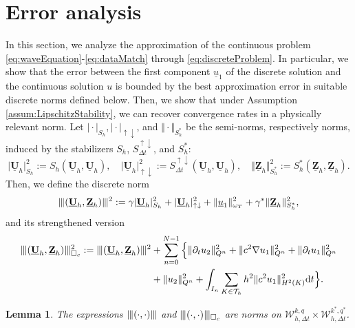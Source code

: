 \documentclass[sn-mathphys-num]{sn-jnl}
\newtheorem{lem}[thm]{Lemma}
\numberwithin{equation}{section}
\newcommand{\wop}{\square_c}
\newcommand{\tnorm}[1]{\vert\hspace{-0.3mm}\Vert#1\Vert\hspace{-0.3mm}\vert}
\newcommand{\dT}{\mathrm{d}t}
\newcommand{\ProdFullyDiscrSpace}[2]{ \mathcal{W}^{ {#1},{#2}}_{h, \Delta t  } }
\newcommand{\Uh}{\underline{\mathbf{U}}_h}
\newcommand{\Zh}{\underline{\mathbf{Z}}_h}
\newcommand{\ul}{\underline{u}}
\newcommand{\Sud}{S^{\uparrow \downarrow}_{\Delta t}}
\newcommand{\dt}{\partial_t}
\begin{document}
\section{Error analysis}
\noindent In this section, we analyze the approximation of the continuous problem \eqref{eq:waveEquation}-\eqref{eq:dataMatch} through \eqref{eq:discreteProblem}. In particular, we show that the error between the first component $\ul_1$ of the discrete solution and the continuous solution $u$ is bounded by the best approximation error in suitable discrete norms defined below. Then, we show that under Assumption \ref{assum:LipschitzStability}, we can recover convergence rates in a physically relevant norm.
Let $\vert \cdot \vert_{S_h}, \vert \cdot \vert_{\uparrow \downarrow}$, and $\Vert \cdot \Vert_{S_h^{\ast}}$ be the semi-norms, respectively norms, induced by the stabilizers $S_h$, $\Sud$, and $S_h^{\ast}$:
\begin{equation}
    \vert \Uh \vert^2_{S_h} := S_h(\Uh,\Uh), \quad \vert \Uh \vert^2_{\uparrow \downarrow} := \Sud(\Uh,\Uh), \quad \Vert \Zh \Vert^2_{S_h^{\ast}} := S_h^{\ast}(\Zh,\Zh).
\end{equation}
\noindent Then, we define the discrete norm 
\begin{equation}
    \tnorm{ (\Uh,\Zh) }^2 := \gamma \vert \Uh \vert^2_{S_h} + \vert \Uh \vert^2_{\uparrow \downarrow} + \Vert \ul_1 \Vert^2_{\omega_T} + \gamma^{\ast} \Vert \Zh \Vert^2_{S_h^\ast},
\end{equation}
and its strengthened version
\begin{equation}\label{eq:tnormwop}
    \begin{aligned}
        \tnorm{(\Uh, \Zh)}^2_{\wop} := \tnorm{(\Uh, \Zh)}^2 &+ \sum_{n = 0}^{N -1} \Big\{ \Vert \dt u_2 \Vert^2_{Q^n} + \Vert c^2 \nabla u_1 \Vert^2_{Q^n} + \Vert \dt u_1 \Vert^2_{Q^n} \\
        &+ \Vert u_2 \Vert^2_{Q^n} + \int_{I_n} \sum_{K \in \mathcal{T}_h} h^2 \Vert c^2 u_1 \Vert^2_{H^2(K)} \dT \Big\}. 
    \end{aligned}
\end{equation}

\begin{lem}
    The expressions $\tnorm{(\cdot,\cdot)}$ and $\tnorm{(\cdot,\cdot)}_{\wop}$ are norms on $\ProdFullyDiscrSpace{k}{q} \times \ProdFullyDiscrSpace{k^\ast}{q^\ast}$.  
\end{lem}
\end{document}
